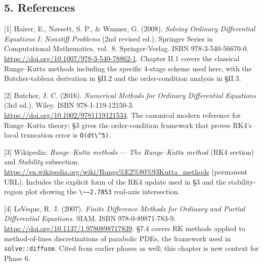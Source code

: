 \subsection{5. References}\label{references}

{[}1{]} Hairer, E., Nørsett, S. P., \& Wanner, G. (2008). \emph{Solving
Ordinary Differential Equations I: Nonstiff Problems} (2nd revised ed.).
Springer Series in Computational Mathematics, vol.~8. Springer-Verlag.
ISBN 978-3-540-56670-0. \url{https://doi.org/10.1007/978-3-540-78862-1}.
Chapter II.1 covers the classical Runge--Kutta methods including the
specific 4-stage scheme used here, with the Butcher-tableau derivation
in §II.2 and the order-condition analysis in §II.3.

{[}2{]} Butcher, J. C. (2016). \emph{Numerical Methods for Ordinary
Differential Equations} (3rd ed.). Wiley. ISBN 978-1-119-12150-3.
\url{https://doi.org/10.1002/9781119121534}. The canonical modern
reference for Runge--Kutta theory; §3 gives the order-condition
framework that proves RK4's local truncation error is
\passthrough{\lstinline!O(dt\^5)!}.

{[}3{]} Wikipedia: \emph{Runge--Kutta methods} --- \emph{The
Runge--Kutta method} (RK4 section) and \emph{Stability} subsection.
\url{https://en.wikipedia.org/wiki/Runge\%E2\%80\%93Kutta_methods}
(permanent URL). Includes the explicit form of the RK4 update used in §3
and the stability-region plot showing the
\passthrough{\lstinline!\~−2.7853!} real-axis intersection.

{[}4{]} LeVeque, R. J. (2007). \emph{Finite Difference Methods for
Ordinary and Partial Differential Equations}. SIAM. ISBN
978-0-89871-783-9. \url{https://doi.org/10.1137/1.9780898717839}. §7.4
covers RK methods applied to method-of-lines discretizations of
parabolic PDEs, the framework used in
\passthrough{\lstinline!solve::diffuse!}. Cited from earlier phases as
well; this chapter is new context for Phase 6.
